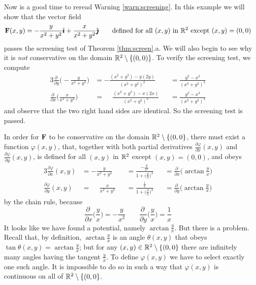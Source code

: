\begin{eg}\label{eg:screeningCounterexample}
Now is a good time to reread Warning \ref{warn:screening}.
In this example we will show that the vector field
\begin{equation*}
\mathbf{F}(x,y) = -\frac{y}{x^2+y^2}\hat{\pmb{\imath}} + \frac{x}{x^2+y^2}\hat{\pmb{\jmath}}
\qquad \text{defined for all $(x,y)$ in $\mathbb{R}^2$ except $(x,y)=(0,0)$}
\end{equation*}
passes the screening test of Theorem \ref{thm:screen}.a. We will also
begin to see why it is \emph{not} conservative on the domain
$\mathbb{R}^2\setminus\{(0,0)\}$. To verify the screening test, we compute
\begin{alignat*}{3}
\frac{\partial\ }{\partial y}\Big(-\frac{y}{x^2+y^2}\Big)
  &= -\frac{(x^2+y^2) - y(2y)}{{(x^2+y^2)}^2} 
  &&= \frac{y^2-x^2}{{(x^2+y^2)}^2} \\
\frac{\partial\ }{\partial x}\Big(\frac{x}{x^2+y^2}\Big)
  &=\phantom{-} \frac{(x^2+y^2) - x(2x)}{{(x^2+y^2)}^2} 
  &&= \frac{y^2-x^2}{{(x^2+y^2)}^2}
\end{alignat*}
and observe that the two right hand sides are identical. So the
screening test is passed.

In order for $\mathbf{F}$ to be conservative on the domain
$\mathbb{R}^2\setminus\{(0,0\}$, there must exist a function
$\varphi(x,y)$, that, together with both partial derivatives 
$\frac{\partial \varphi}{\partial x}(x,y)$ and 
$\frac{\partial \varphi}{\partial y}(x,y)$, is defined for all $(x,y)$ 
in $\mathbb{R}^2$ except $(x,y)=(0,0)$, and obeys
\begin{alignat*}{3}
\frac{\partial \varphi}{\partial x}(x,y) &= -\frac{y}{x^2+y^2}
&&= \frac{-\frac{y}{x^2}}{1+\big(\frac{y}{x}\big)^2}
&&=\frac{\partial\ }{\partial x}\Big(\arctan\frac{y}{x}\Big) \\
\frac{\partial \varphi}{\partial y}(x,y) &= \phantom{-} \frac{x}{x^2+y^2} 
&&= \frac{\frac{1}{x}}{1+\big(\frac{y}{x}\big)^2}
&&=\frac{\partial\ }{\partial y}\Big(\arctan\frac{y}{x}\Big)
\end{alignat*}
by the chain rule, because
\begin{equation*}
\frac{\partial\ }{\partial x}\Big(\frac{y}{x}\Big) =-\frac{y}{x^2}
\qquad
\frac{\partial\ }{\partial y}\Big(\frac{y}{x}\Big)=\frac{1}{x}
\end{equation*}
It looks like we have found a potential, namely $\arctan\frac{y}{x}$.
But there is a problem. Recall that, by definition, $\arctan\frac{y}{x}$ is 
an angle $\theta(x,y)$ that obeys
$\tan\theta(x,y)= \arctan\frac{y}{x}$; but for any 
$(x,y)\in\mathbb{R}^2\setminus\{(0,0\}$ there are infinitely many angles 
having the tangent $\frac{y}{x}$. To define $\varphi(x,y)$ we have to 
select exactly one such angle. It is impossible to do so in such a way 
that $\varphi(x,y)$ is continuous on all of $\mathbb{R}^2\setminus\{(0,0\}$.


\end{eg}
